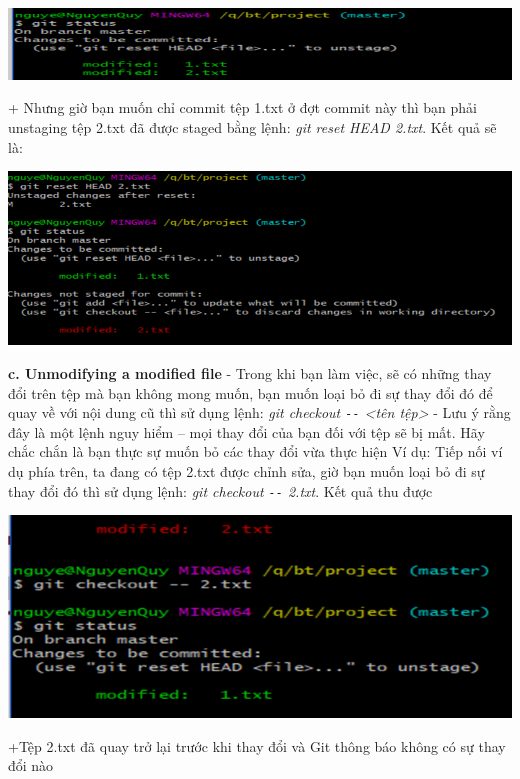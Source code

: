 \documentclass[12pt,a4paper]{report}
\begin{document}
	\includegraphics[width=0.8\linewidth]{screenshot029}

	\label{fig:screenshot029}
\vskip 0.4cm\vskip 0.4cm
+ Nhưng giờ bạn muốn chỉ commit tệp 1.txt ở đợt commit này thì bạn phải unstaging tệp 2.txt đã được staged bằng lệnh: {\it git reset HEAD 2.txt}. Kết quả sẽ là:\vskip 0.4cm

	\includegraphics[width=0.8\linewidth]{screenshot030}

	\label{fig:screenshot030}
\vskip 0.4cm\vskip 0.4cm
{\bf c. Unmodifying a modified file}\vskip 0.4cm
- Trong khi bạn làm việc, sẽ có những thay đổi trên tệp mà bạn không mong muốn, bạn muốn loại bỏ đi sự thay đổi đó để quay về với nội dung cũ thì sử dụng lệnh: {\it git checkout \texttt{-{}-} <tên tệp>}\vskip 0.4cm
- Lưu ý rằng đây là một lệnh nguy hiểm – mọi thay đổi của bạn đối với tệp sẽ bị mất. Hãy chắc chắn là bạn thực sự muốn bỏ các thay đổi vừa thực hiện\vskip 0.4cm
Ví dụ: Tiếp nối ví dụ phía trên, ta đang có tệp 2.txt được chỉnh sửa, giờ bạn muốn loại bỏ đi sự thay đổi đó thì sử dụng lệnh: {\it git checkout \texttt{-{}-} 2.txt}. Kết quả thu được\vskip 0.4cm

	\includegraphics[width=0.8\linewidth]{screenshot031}

	\label{fig:screenshot031}
\vskip 0.4cm\vskip 0.4cm
+Tệp 2.txt đã quay trở lại trước khi thay đổi và Git thông báo không có sự thay đổi nào\vskip 0.4cm




\newpage
\end{document}
